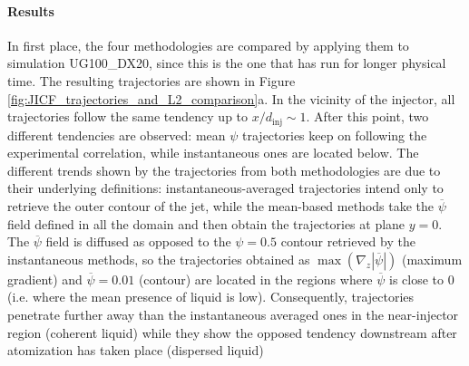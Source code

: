 \paragraph*{Results}

In first place, the four methodologies are compared by applying them to simulation UG100\_DX20, since this is the one that has run for longer physical time. The resulting trajectories are shown in Figure \ref{fig:JICF_trajectories_and_L2_comparison}a. In the vicinity of the injector, all trajectories follow the same tendency up to $x/d_\mathrm{inj} \sim 1$. After this point, two different tendencies are observed: mean $\psi$ trajectories keep on following the experimental correlation, while instantaneous ones are located below. The different trends shown by the trajectories from both methodologies are due to their underlying definitions: instantaneous-averaged trajectories intend only to retrieve the outer contour of the jet, while the mean-based methods take the $\overline{\psi}$ field defined in all the domain and then obtain the trajectories at plane $y = 0$. The $\overline{\psi}$ field is diffused as opposed to the $\psi = 0.5$ contour retrieved by the instantaneous methods, so the trajectories obtained as $\max \left( \nabla_z | \overline{\psi} | \right)$ (maximum gradient) and $\overline{\psi} = 0.01$ (contour) are located in the regions where $\overline{\psi}$ is close to $0$ (i.e. where the mean presence of liquid is low). Consequently, trajectories penetrate further away than the instantaneous averaged ones in the near-injector region (coherent liquid) while they show the opposed tendency downstream after atomization has taken place (dispersed liquid) \\


